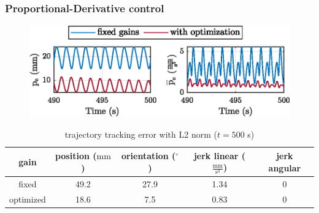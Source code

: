 	\begin{frame}
		\frametitle{Proportional-Derivative control}
		\graphicspath{{images/methodology/PD/exp1/circular/uncertainty_100_alpha_0.005/}}
		\begin{figure}
			\centering
			\includegraphics{pe_cartesian.eps}
		\end{figure}

		\begin{table}
			\caption{trajectory tracking error with L2 norm ($t=500$ s)}
			\centering
			\begin{tabular}{c c c c c}
			\toprule
			gain & position ($\mathrm{mm}$) & orientation ($^\circ$) & jerk linear ($\mathrm{\frac{mm}{s^3}}$) & jerk angular \\
			\midrule
			fixed  & 49.2 & 27.9 & 1.34 & 0 \\ 
			optimized & 18.6 & 7.5 & 0.83 & 0  \\
			\bottomrule
			\end{tabular}
		\end{table}		
	\end{frame}	
	

